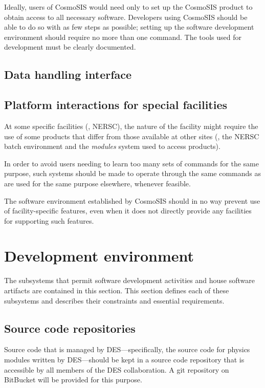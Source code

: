 \documentclass[draftmode,draftwater]{memarticle}
\begin{document}
Ideally, users of CosmoSIS would need only to set up the CosmoSIS
product to obtain access to all necessary software. Developers using
CosmoSIS should be able to do so with as few steps as possible; setting
up the software development environment should require no more than one
command. The tools used for development must be clearly documented.

\subsection{Data handling interface}


\subsection{Platform interactions for special facilities}

At some specific facilities (\eg, NERSC), the nature of the facility
might require the use of some products that differ from those available
at other sites (\eg, the NERSC batch environment and the \emph{modules}
system used to access products).

In order to avoid users needing to learn too many sets of commands for
the same purpose, such systems should be made to operate through the
same commands as are used for the same purpose elsewhere, whenever
feasible.

The software environment established by CosmoSIS should in no way
prevent use of facility-specific features, even when it does not
directly provide any facilities for supporting such features.

\section{Development environment}

The subsystems that permit software development activities and house
software artifacts are contained in this section. This section defines
each of these subsystems and describes their constraints and essential
requirements.

\subsection{Source code repositories}

Source code that is managed by DES---specifically, the source code for
physics modules written by DES---should be kept in a source code
repository that is accessible by all members of the DES collaboration. A
git repository on BitBucket will be provided for this purpose.
\end{document}
